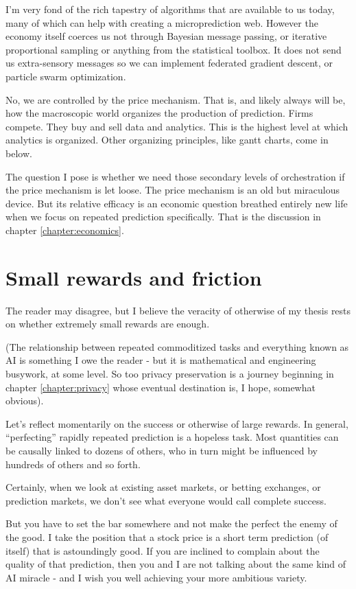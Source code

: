 I'm very fond of the rich tapestry of algorithms that are available to us today, many of which can help with creating a microprediction web. However the economy itself coerces us not through Bayesian message passing, or iterative proportional sampling or anything from the statistical toolbox. It does not send us extra-sensory messages so we can implement federated gradient descent, or particle swarm optimization. 


No, we are controlled by the price mechanism. That is, and likely always will be, how the macroscopic world organizes the production of prediction. Firms compete. They buy and sell data and analytics. This is the highest level at which analytics is organized. Other organizing principles, like gantt charts, come in below. 

The question I pose is whether we need those secondary levels of orchestration if the price mechanism is let loose. The price mechanism is an old but miraculous device. But its relative efficacy is an economic question breathed entirely new life when we focus on repeated prediction specifically. That is the discussion in chapter \ref{chapter:economics}. 

\section{Small rewards and friction}

The reader may disagree, but I believe the veracity of otherwise of my thesis rests on whether extremely small rewards are enough. 

(The relationship between repeated commoditized tasks and everything known as AI is something I owe the reader - but it is mathematical and engineering busywork, at some level. So too privacy preservation is a journey beginning in chapter \ref{chapter:privacy} whose eventual destination is, I hope, somewhat obvious).     

Let's reflect momentarily on the success or otherwise of large rewards. In general, ``perfecting'' rapidly repeated prediction is a hopeless task. Most quantities can be causally linked to dozens of others, who in turn might be influenced by hundreds of others and so forth. 

Certainly, when we look at existing asset markets, or betting exchanges, or prediction markets, we don't see what everyone would call complete success. 

But you have to set the bar somewhere and not make the perfect the enemy of the good. I take the position that a stock price is a short term prediction (of itself) that is astoundingly good. If you are inclined to complain about the quality of that prediction, then you and I are not talking about the same kind of AI miracle - and I wish you well achieving your more ambitious variety.  


